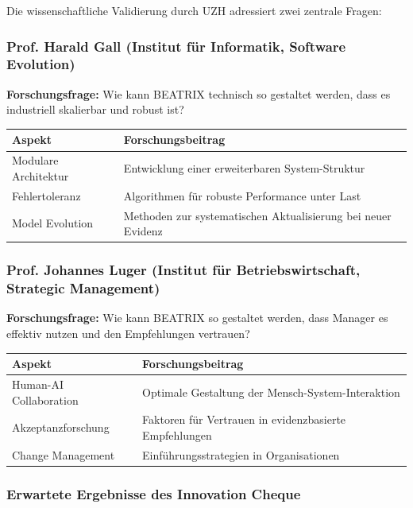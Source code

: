 \documentclass[11pt,a4paper]{article}
\begin{document}
Die wissenschaftliche Validierung durch UZH adressiert zwei zentrale Fragen:

\subsubsection{Prof. Harald Gall (Institut für Informatik, Software Evolution)}

\textbf{Forschungsfrage:} Wie kann BEATRIX technisch so gestaltet werden, dass es industriell skalierbar und robust ist?

\begin{table}[h]
\centering
\begin{tabularx}{\textwidth}{lX}
\toprule
\textbf{Aspekt} & \textbf{Forschungsbeitrag} \\
\midrule
Modulare Architektur & Entwicklung einer erweiterbaren System-Struktur \\
Fehlertoleranz & Algorithmen für robuste Performance unter Last \\
Model Evolution & Methoden zur systematischen Aktualisierung bei neuer Evidenz \\
\bottomrule
\end{tabularx}
\end{table}

\subsubsection{Prof. Johannes Luger (Institut für Betriebswirtschaft, Strategic Management)}

\textbf{Forschungsfrage:} Wie kann BEATRIX so gestaltet werden, dass Manager es effektiv nutzen und den Empfehlungen vertrauen?

\begin{table}[h]
\centering
\begin{tabularx}{\textwidth}{lX}
\toprule
\textbf{Aspekt} & \textbf{Forschungsbeitrag} \\
\midrule
Human-AI Collaboration & Optimale Gestaltung der Mensch-System-Interaktion \\
Akzeptanzforschung & Faktoren für Vertrauen in evidenzbasierte Empfehlungen \\
Change Management & Einführungsstrategien in Organisationen \\
\bottomrule
\end{tabularx}
\end{table}

\subsubsection{Erwartete Ergebnisse des Innovation Cheque}
\end{document}
